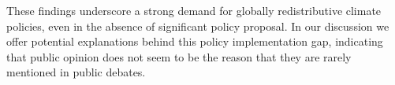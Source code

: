 \documentclass{nature}
\begin{document}

These findings underscore a strong demand for globally redistributive climate policies, even in the absence of significant policy proposal. In our discussion we offer potential explanations behind this policy implementation gap, indicating that public opinion does not seem to be the reason that they are rarely mentioned in public debates.




\end{document}
